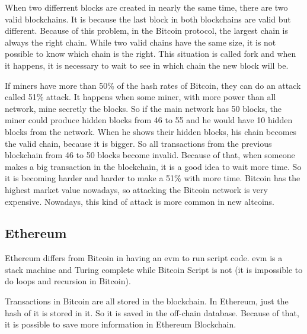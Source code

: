 When two differrent blocks are created in nearly the same time, there are two valid blockchains.
It is because the last block in both blockchains are valid but different.
Because of this problem, in the Bitcoin protocol, the largest chain is always the right chain.
While two valid chains have the same size, it is not possible to know which chain is the right.
This situation is called fork and when it happens, it is necessary to wait to see in which chain
the new block will be.

If miners have more than 50\% of the hash rates of Bitcoin, they can do an attack called 
51\% attack.
It happens when some miner, with more power than all network, mine secretly the blocks.
So if the main network has 50 blocks, the miner could produce hidden blocks from 46 to 55
and he would have 10 hidden blocks from the network.
When he shows their hidden blocks, his chain becomes the valid chain, because it is bigger.
So all transactions from the previous blockchain from 46 to 50 blocks become invalid.
Because of that, when someone makes a big transaction in the blockchain, it is a good idea
to wait more time.
So it is becoming harder and harder to make a 51\% with more time.
Bitcoin has the highest market value nowadays, so attacking the Bitcoin network is very expensive.
Nowadays, this kind of attack is more common in new altcoins.


\subsection{Ethereum}

Ethereum differs from Bitcoin in having an \gls{evm} to run script code.
\gls{evm} is a stack machine and Turing complete \cite{turing1936computable} while Bitcoin Script is not
(it is impossible to do loops and recursion in Bitcoin).

Transactions in Bitcoin are all stored in the blockchain.
In Ethereum, just the hash of it is stored in it.
So it is saved in the off-chain database.
Because of that, it is possible to save more information in Ethereum Blockchain.

